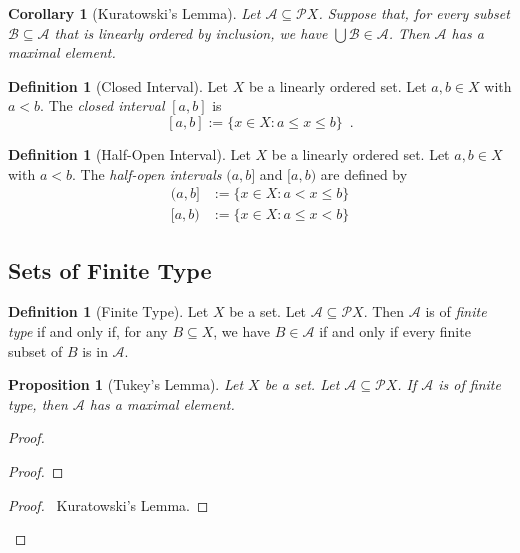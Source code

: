\documentclass{book}
\let\qed\relax
\newtheorem{prop}[ax]{Proposition}
\newtheorem{cor}{Corollary}[ax]
\theoremstyle{definition}
\newtheorem{df}[ax]{Definition}
\begin{document}
\begin{cor}[Kuratowski's Lemma]
Let $\mathcal{A} \subseteq \mathcal{P} X$. Suppose that, for every subset $\mathcal{B} \subseteq \mathcal{A}$ that is linearly ordered by inclusion, we have $\bigcup \mathcal{B} \in \mathcal{A}$. Then $\mathcal{A}$ has a maximal element.
\end{cor}

\begin{df}[Closed Interval]
Let $X$ be a linearly ordered set. Let $a,b \in X$ with $a < b$. The \emph{closed interval} $[a,b]$ is
\[ [a,b] := \{ x \in X : a \leq x \leq b \} \enspace . \]
\end{df}

\begin{df}[Half-Open Interval]
Let $X$ be a linearly ordered set. Let $a,b \in X$ with $a < b$. The \emph{half-open intervals} $(a,b]$ and $[a,b)$ are defined by
\begin{align*}
(a,b] & := \{ x \in X : a < x \leq b \} \\
[a,b) & := \{ x \in X : a \leq x < b \}
\end{align*}
\end{df}

\subsection{Sets of Finite Type}

\begin{df}[Finite Type]
Let $X$ be a set. Let $\mathcal{A} \subseteq \mathcal{P} X$. Then $\mathcal{A}$ is of \emph{finite type} if and only if, for any $B \subseteq X$, we have $B \in \mathcal{A}$ if and only if every finite subset of $B$ is in $\mathcal{A}$.
\end{df}

\begin{prop}[Tukey's Lemma]
Let $X$ be a set. Let $\mathcal{A} \subseteq \mathcal{P} X$. If $\mathcal{A}$ is of finite type, then $\mathcal{A}$ has a maximal element.
\end{prop}

\begin{proof}
\pf
{}
\begin{proof}
\end{proof}
\qedstep
\begin{proof}
	\pf\ Kuratowski's Lemma.
\end{proof}
\qed
\end{proof}
\end{document}
